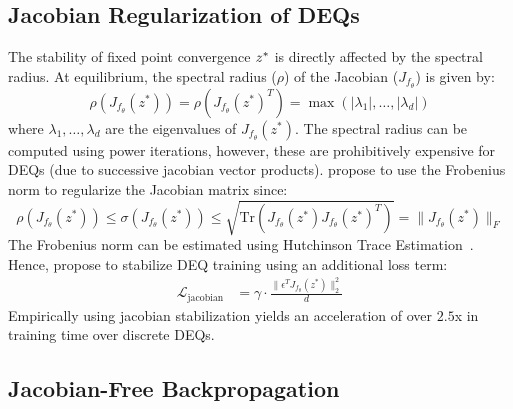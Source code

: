 \subsection{Jacobian Regularization of DEQs}
\label{subsec:jacobian_regularization_deqs}

The stability of fixed point convergence $z^*$ is directly affected by the spectral radius. At equilibrium, the spectral radius ($\rho$) of the Jacobian ($J_{f_\theta}$) is given by:
%
\begin{equation}
  \rho\left( J_{f_\theta}(z^*) \right) = \rho\left( J_{f_\theta}(z^*)^T \right) = \max \left( |\lambda_1|, \dots, |\lambda_d| \right)
\end{equation}
%
where $\lambda_1, \dots, \lambda_d$ are the eigenvalues of $J_{f_\theta}(z^*)$. The spectral radius can be computed using power iterations, however, these are prohibitively expensive for DEQs (due to successive jacobian vector products). \citet{bai2021stabilizing} propose to use the Frobenius norm to regularize the Jacobian matrix since:
%
\begin{equation}
  \rho\left( J_{f_\theta}(z^*) \right) \leq \sigma\left( J_{f_\theta}(z^*) \right) \leq \sqrt{\text{Tr}\left(J_{f_\theta}(z^*) J_{f_\theta}(z^*)^T\right)} = \|J_{f_\theta}(z^*)\|_F
\end{equation}
%
The Frobenius norm can be estimated using Hutchinson Trace Estimation~\citep{hutchinson1989stochastic}. Hence, \citet{bai2021stabilizing} propose to stabilize DEQ training using an additional loss term:
%
\begin{align}
  \mathcal{L}_{\text{jacobian}} &= \gamma \cdot \frac{\| \epsilon^T J_{f_\theta}(z^*) \|_2^2}{d}
\end{align}
%
Empirically using jacobian stabilization yields an acceleration of over $2.5$x in training time over discrete DEQs.

\subsection{Jacobian-Free Backpropagation}
\label{subsec:jacobian_free_backpropagation}

